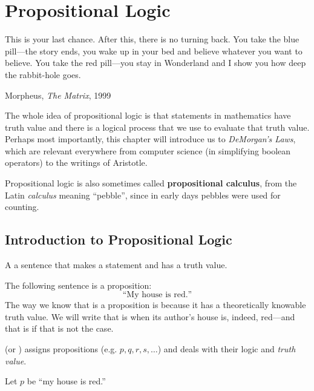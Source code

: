 \chapter{Propositional Logic}
\epigraph{This is your last chance. After this, there is no turning back. You
take the blue pill---the story ends, you wake up in your bed and believe
whatever you want to believe. You take the red pill---you stay in Wonderland and
I show you how deep the rabbit-hole goes.}{Morpheus, \emph{The Matrix}, 1999}
\label{ch:propositional}

The whole idea of propositional logic is that statements in mathematics have truth value and there is a logical process that we use to evaluate that truth value.
Perhaps most importantly, this chapter will introduce us to \emph{DeMorgan's Laws}, which are relevant everywhere from computer science (in simplifying boolean operators) to the writings of Aristotle.

\begin{remark}
Propositional logic is also sometimes called \textbf{propositional calculus},
from the Latin \emph{calculus} meaning ``pebble'', since in early days pebbles
were used for counting.\cite{wiktionary-calculus}
\end{remark}

\section{Introduction to Propositional Logic}
\label{sec:propintro}

\begin{defn}[proposition]
A  a sentence that makes a statement
and has a truth value.
\end{defn}

\begin{ex}
  The following sentence is a proposition:
  \begin{equation}
    \text{``My house is red.''}
    \label{eq:ex:proposition}
  \end{equation}
  The way we know that  is a proposition is because
  it has a theoretically knowable truth value.
  We will write that  is \ltrue{} when its author's
  house is, indeed, red---and that  is \lfalse{}
  if that is not the case.
\end{ex}

  (or )
  assigns propositions 
  (e.g. \(p, q, r, s, \ldots\))
  and deals with their logic and \emph{truth value}.
  \begin{ex}
    Let $p$ be ``my house is red.''
  \end{ex}

